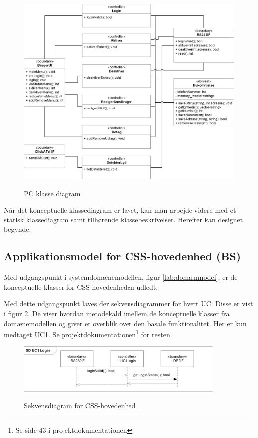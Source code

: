 \clearpage
\begin{figure}[htbp] \centering
{\includegraphics[width=\textwidth]{billeder/uml/PC_class}}
\caption{PC klasse diagram}
\label{lab: PC klasse diagram}
\end{figure}

Når det konceptuelle klassediagram er lavet, kan man arbejde  videre med et statisk klassediagram samt tilhørende klassebeskrivelser. Herefter kan designet begynde. 

%
%
\subsection{Applikationsmodel for CSS-hovedenhed (BS)}
Med udgangspunkt i systemdomænemodellen, figur \ref{lab:domainmodel}, er de konceptuelle klasser for CSS-hovedenheden udledt. 

Med dette udgangspunkt laves der sekvensdiagrammer for hvert UC. Disse er vist i figur \ref{fig:CSS_hovedenhed_sd}. De viser hvordan metodekald imellem de konceptuelle klasser fra domænemodellen og giver et overblik over den basale funktionalitet. Her er kun medtaget UC1. Se projektdokumentationen\footnote{Se side 43 i projektdokumentationen} for resten.

\begin{figure}[!htb]
     \centering
     { \includegraphics[width=0.9\textwidth]{Billeder/UML/CSS_hovedenhed_SD}}
     \caption{Sekvensdiagram for CSS-hovedenhed}
     \label{fig:CSS_hovedenhed_sd}
\end{figure}

